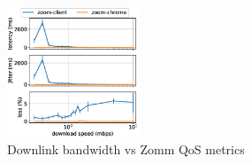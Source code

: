 \begin{figure}[]
    \includegraphics[width=0.35\textwidth,keepaspectratio]{figures/static/downlink_qos_zoom.eps}
    \caption{Downlink bandwidth vs Zomm QoS metrics}
    \label{fig:downlink_qos_zoom}
\end{figure}

